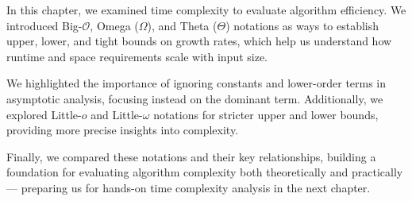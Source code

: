 In this chapter, we examined time complexity to evaluate algorithm efficiency. We introduced Big-$\mathcal{O}$, Omega ($\Omega$), and Theta ($\Theta$) notations as ways to establish upper, lower, and tight bounds on growth rates, which help us understand how runtime and space requirements scale with input size.

We highlighted the importance of ignoring constants and lower-order terms in asymptotic analysis, focusing instead on the dominant term. Additionally, we explored Little-$o$ and Little-$\omega$ notations for stricter upper and lower bounds, providing more precise insights into complexity.

Finally, we compared these notations and their key relationships, building a foundation for evaluating algorithm complexity both theoretically and practically — preparing us for hands-on time complexity analysis in the next chapter.